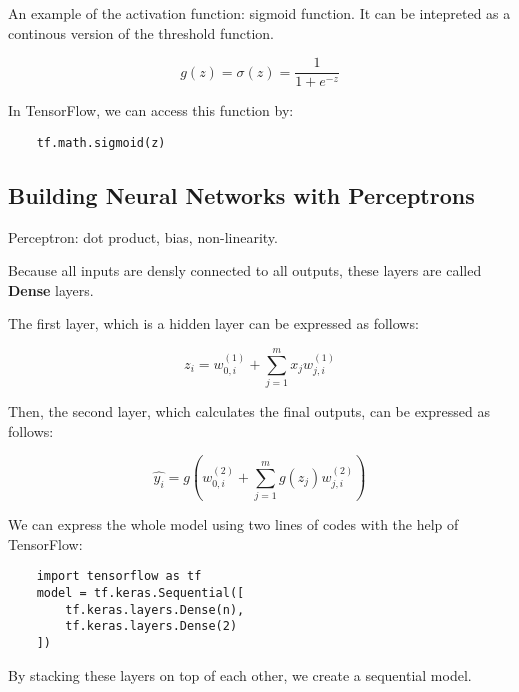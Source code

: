 \documentclass[12pt, a4paper, oneside]{article}
\begin{document}
An example of the activation function: sigmoid function. It can be intepreted as a continous version of the threshold function.

\begin{equation}
    g(z)=\sigma(z)=\frac{1}{1+e^{-z}}
\end{equation}

In TensorFlow, we can access this function by:

\begin{lstlisting}
    tf.math.sigmoid(z)
\end{lstlisting}

\subsection{Building Neural Networks with Perceptrons}

Perceptron: dot product, bias, non-linearity.

Because all inputs are densly connected to all outputs, these layers are called \textbf{Dense} layers.

The first layer, which is a hidden layer can be expressed as follows:

\begin{equation}
    z_{i}=w_{0,i}^{(1)}+\sum_{j=1}^{m}x_{j}w_{j,i}^{(1)}
\end{equation}

Then, the second layer, which calculates the final outputs, can be expressed as follows:

\begin{equation}
    \hat{y_{i}}=g(w_{0,i}^{(2)}+\sum_{j=1}^{m}g(z_{j})w_{j,i}^{(2)})
\end{equation}

We can express the whole model using two lines of codes with the help of TensorFlow:

\begin{lstlisting}
    import tensorflow as tf
    model = tf.keras.Sequential([
        tf.keras.layers.Dense(n),
        tf.keras.layers.Dense(2)
    ])
\end{lstlisting}

By stacking these layers on top of each other, we create a sequential model.
\end{document}
